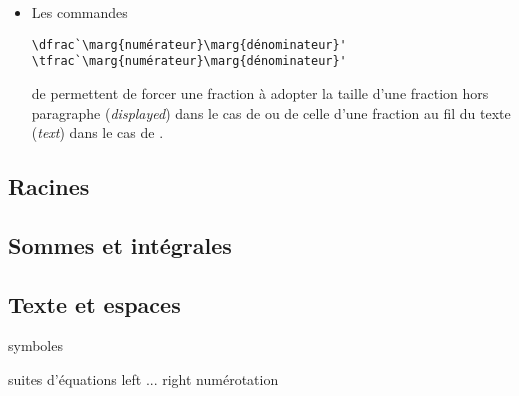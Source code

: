 \begin{itemize}
\item Les commandes
\begin{lstlisting}
\dfrac`\marg{numérateur}\marg{dénominateur}'
\tfrac`\marg{numérateur}\marg{dénominateur}'
\end{lstlisting}
  de  permettent de forcer une fraction à adopter la
  taille d'une fraction hors paragraphe (\emph{displayed}) dans le cas
  de \cmd{\dfrac} ou de celle d'une fraction au fil du texte
  (\emph{text}) dans le cas de \cmd{\tfrac}.
\end{itemize}

\subsection{Racines}
\label{sec:math:bases:racines}

\subsection{Sommes et intégrales}
\label{sec:math:bases:sommes-et-integrales}

\subsection{Texte et espaces}
\label{sec:math:bases:texte}



symboles

suites d'équations
  left ... right
  numérotation

